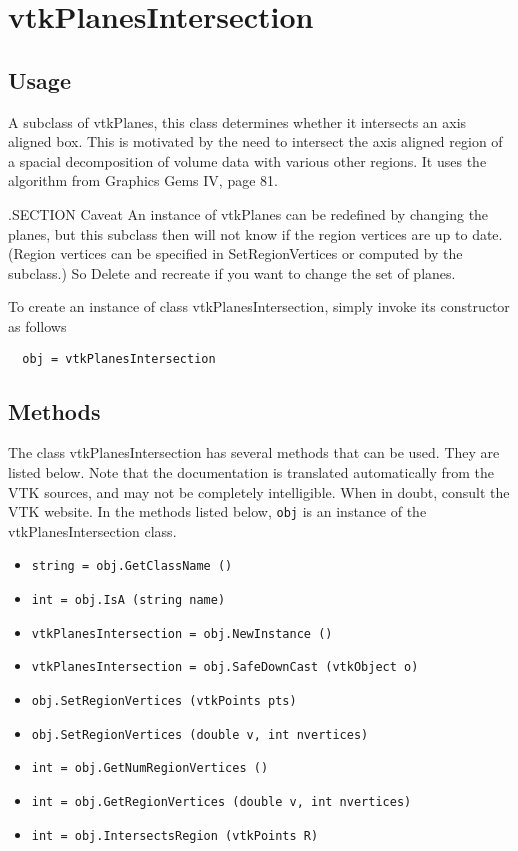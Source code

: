 \section{vtkPlanesIntersection}

\subsection{Usage}

    A subclass of vtkPlanes, this class determines whether it
    intersects an axis aligned box.   This is motivated by the
    need to intersect the axis aligned region of a spacial
    decomposition of volume data with various other regions.
    It uses the algorithm from Graphics Gems IV, page 81.

 .SECTION Caveat
    An instance of vtkPlanes can be redefined by changing the planes,
    but this subclass then will not know if the region vertices are
    up to date.  (Region vertices can be specified in SetRegionVertices
    or computed by the subclass.)  So Delete and recreate if you want
    to change the set of planes.


To create an instance of class vtkPlanesIntersection, simply
invoke its constructor as follows
\begin{verbatim}
  obj = vtkPlanesIntersection
\end{verbatim}
\subsection{Methods}

The class vtkPlanesIntersection has several methods that can be used.
  They are listed below.
Note that the documentation is translated automatically from the VTK sources,
and may not be completely intelligible.  When in doubt, consult the VTK website.
In the methods listed below, \verb|obj| is an instance of the vtkPlanesIntersection class.
\begin{itemize}
\item  \verb|string = obj.GetClassName ()|

\item  \verb|int = obj.IsA (string name)|

\item  \verb|vtkPlanesIntersection = obj.NewInstance ()|

\item  \verb|vtkPlanesIntersection = obj.SafeDownCast (vtkObject o)|

\item  \verb|obj.SetRegionVertices (vtkPoints pts)|

\item  \verb|obj.SetRegionVertices (double v, int nvertices)|

\item  \verb|int = obj.GetNumRegionVertices ()|

\item  \verb|int = obj.GetRegionVertices (double v, int nvertices)|

\item  \verb|int = obj.IntersectsRegion (vtkPoints R)|

\end{itemize}
